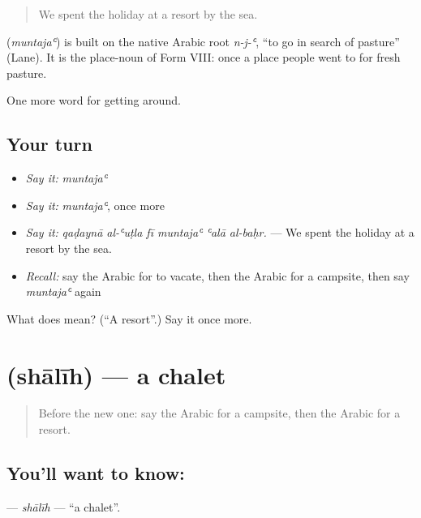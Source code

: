 \begin{quote}
We spent the holiday at a resort by the sea.
\end{quote}

\begin{cousinweb}
\textbf{} (\emph{muntajaʿ}) is built on the native Arabic root \emph{n-j-ʿ}, \textquotedblleft{}to go in search of pasture\textquotedblright{} (Lane). It is the place-noun of Form VIII: once a place people went to for fresh pasture.
\end{cousinweb}

\begin{grammarlens}[title={What you've built}]
One more word for getting around.
\end{grammarlens}

\subsection*{Your turn}
\begin{itemize}
\raggedright
  \item \emph{Say it:} \emph{muntajaʿ}
  \item \emph{Say it:} \emph{muntajaʿ}, once more
  \item \emph{Say it:} \emph{qaḍaynā al-ʿuṭla fī muntajaʿ ʿalā al-baḥr.} — We spent the holiday at a resort by the sea.
  \item \emph{Recall:} say the Arabic for to vacate, then the Arabic for a campsite, then say \emph{muntajaʿ} again
\end{itemize}

\begin{tcolorbox}[breakable,colback=teal!4,colframe=teal!35!black,title={Before you move on}]
What does  mean? (\textquotedblleft{}A resort\textquotedblright{}.) Say it once more.
\end{tcolorbox}
\section[\texorpdfstring{\ar{شاليه} (shālīh)}{شاليه (shālīh)}]{ (shālīh) — a chalet}

\label{lesson:AR-C442-shalih}



\begin{quote}
Before the new one: say the Arabic for a campsite, then the Arabic for a resort.
\end{quote}

\subsection*{You'll want to know: }
\textbf{} — \emph{shālīh} — \textquotedblleft{}a chalet\textquotedblright{}.

